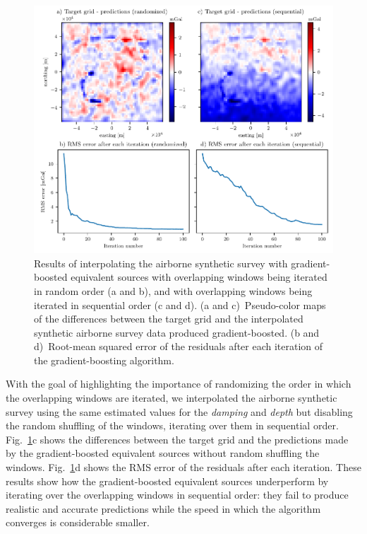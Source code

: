 \begin{figure}
    \includegraphics[width=\linewidth]{figs/eql-boost-airborne.pdf}
    \caption{
        Results of interpolating the airborne synthetic survey with
        gradient-boosted equivalent sources with overlapping windows being
        iterated in random order (a and b), and with overlapping windows being
        iterated in sequential order (c and d).
        (a and c)~Pseudo-color maps of the differences between the target grid
        and the interpolated synthetic airborne survey data produced
        gradient-boosted.
        (b and d)~Root-mean squared error of the residuals after each iteration
        of the gradient-boosting algorithm.
}
\label{fig:eql-boost-airborne}
\end{figure}

With the goal of highlighting the importance of randomizing the order in which
the overlapping windows are iterated, we interpolated the airborne synthetic
survey using the same estimated values for the \emph{damping} and
\emph{depth} but disabling the random shuffling of the windows, iterating over
them in sequential order.
Fig.~\ref{fig:eql-boost-airborne}c shows the differences between the target
grid and the predictions made by the gradient-boosted equivalent sources
without random shuffling the windows.
Fig.~\ref{fig:eql-boost-airborne}d shows the RMS error of the
residuals after each iteration.
These results show how the gradient-boosted equivalent sources underperform by
iterating over the overlapping windows in sequential order: they fail to
produce realistic and accurate predictions while the speed in which the
algorithm converges is considerable smaller.


